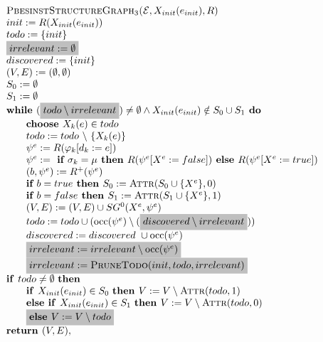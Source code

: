 \documentclass{article}
\newcommand{\Space}{\text{\ }}
\newcommand{\If}{\text{\textbf{if }}}
\newcommand{\Then}{\text{\textbf{then }}}
\newcommand{\Else}{\text{\textbf{else }}}
\begin{document}
\begin{equation*}
\begin{array}{l}
\textsc{PbesinstStructureGraph$_{3}$(}\mathcal{E}, X_{init}(e_{init}), R) \\ 
init:=R(X_{init}(e_{init})) \\
todo:=\{init\} \\
\colorbox{lightgray}{$irrelevant := \emptyset$} \\
discovered:=\{init\} \\
(V,E) :=(\emptyset ,\emptyset ) \\ 
S_0:= \emptyset \\
S_1:= \emptyset \\
\textbf{while }(\colorbox{lightgray}{$todo \setminus irrelevant$}) \neq \emptyset
\wedge X_{init}(e_{init}) \notin S_0 \cup S_1
\textbf{ do} \\ 
\qquad \text{\textbf{choose }}X_{k}(e)\in todo \\ 
\qquad todo:=todo\ \backslash \ \{X_{k}(e)\} \\ 
\qquad \psi ^{e}:=R(\varphi _{k}[d_{k}:=e]) \\ 
\qquad \psi^e := \textbf{ if } \sigma_k = \mu \textbf{ then } R(\psi^e[X^e := false])
\textbf{ else }  R(\psi^e[X^e := true]) \\
\qquad (b,\psi^e) := R^+(\psi^e) \\
\qquad \textbf{if $b = true$ then } S_0 := \textsc{Attr}(S_0 \cup \{ X^e \}, 0) \\
\qquad \textbf{if $b = false$ then } S_1 := \textsc{Attr}(S_1 \cup \{ X^e \}, 1) \\
\qquad (V,E) := (V,E) \cup SG^{0}(X^{e},\psi ^{e}) \\ 
\qquad todo := todo\cup (\mathrm{occ}(\psi ^{e})\setminus (\colorbox{lightgray}{$discovered \setminus irrelevant$})) \\
\qquad discovered := discovered\ \cup \mathrm{occ}(\psi^e) \\
\qquad \colorbox{lightgray}{$irrelevant := irrelevant \setminus \mathrm{occ}(\psi^e)$} \\
\qquad \colorbox{lightgray}{$irrelevant := \textsc{PruneTodo}(init, todo, irrelevant) $}\\
\If todo \neq \emptyset \Space \Then \\
\qquad \If X_{init}(e_{init}) \in S_0  \Space \Then V := V \setminus \textsc{Attr}(todo, 1) \\
\qquad \Else \If X_{init}(e_{init}) \in S_1 \Space \Then V := V \setminus \textsc{Attr}(todo, 0) \\
\qquad \colorbox{lightgray}{$\Else V := V \setminus todo$} \\

\textbf{return }(V, E),
\end{array}
\end{equation*}
\end{document}
